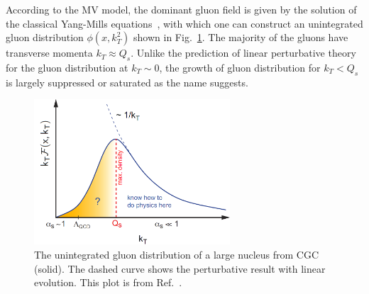 According to the MV model, the dominant gluon field is given by the solution of
the classical Yang-Mills equations~\cite{Kovchegov:1996ty}, with
which one can construct an unintegrated gluon distribution $\phi(x,k^{2}_{T})$
shown in Fig.~\ref{fig:gluon_TMD}. The majority of the gluons have transverse
momenta $k_{T}\approx Q_{s}$. Unlike the prediction of linear perturbative
theory for the gluon distribution at $k_{T}\sim0$, the growth of gluon distribution
for $k_{T}<Q_{s}$ is largely suppressed or saturated as the name suggests.
\begin{figure}
\centering
\includegraphics[width=0.65\textwidth]{plots/chpt3/kt_schematic.png}
\caption[Unintegrated gluon transverse momentum distribution]{
The unintegrated gluon distribution of a large nucleus from CGC (solid). The dashed curve 
shows the perturbative result with linear evolution. This plot is from Ref.~\cite{Accardi:2012qut}.}
\label{fig:gluon_TMD}
\end{figure}



